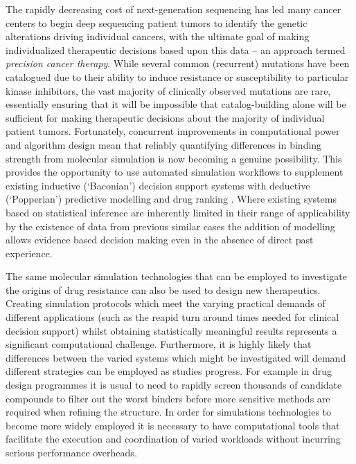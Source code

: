 The rapidly decreasing cost of next-generation sequencing has led many cancer centers to begin deep sequencing patient tumors to identify the genetic alterations driving individual cancers, with the ultimate goal of making individualized therapeutic decisions based upon this data -- an approach termed \textit{precision cancer therapy}.
While several common (recurrent) mutations have been catalogued due to their ability to induce resistance or susceptibility to particular kinase inhibitors, the vast majority of clinically observed mutations are rare, essentially ensuring that it will be impossible that catalog-building alone will be sufficient for making therapeutic decisions about the majority of individual patient tumors.
Fortunately, concurrent improvements in computational power and algorithm design mean that reliably quantifying differences in binding strength from molecular simulation is now becoming a genuine possibility.
This provides the opportunity to use automated simulation workflows to supplement existing inductive (`Baconian') decision support systems with deductive (`Popperian') predictive modelling and drug ranking \cite{Marias2011, Sloot2009}.
Where existing systems based on statistical inference are inherently limited in their range of applicability by the existence of data from previous similar cases the addition of modelling allows evidence based decision making even in the absence of direct past experience.

The same molecular simulation technologies that can be employed to investigate the origins of drug resistance can also be used to design new therapeutics.
Creating simulation protocols which meet the varying practical demands of different applications (such as the reapid turn around times needed for clinical decision support) whilst obtaining statistically meaningful results represents a significant computational challenge.
Furthermore, it is highly likely that differences between the varied systems which might be investigated  will demand different strategies can be employed as studies progress.
For example in drug design programmes it is usual to need to rapidly screen thousands of candidate compounds to filter out the worst binders before more sensitive methods are required when refining the structure.
In order for simulations technologies to become more widely employed it is necessary to have computational tools that facilitate the execution and coordination of varied workloads without incurring serious performance overheads.

